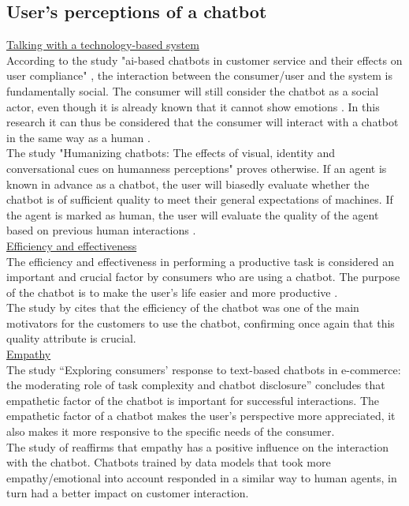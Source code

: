 \subsection{User’s perceptions of a chatbot}
\ul{Talking with a technology-based system}\\
According to the study "\acrshort{ai}-based chatbots in customer service and their effects on user compliance" \citep{Adam2021}, the interaction between the consumer/user and the system is fundamentally social. The consumer will still consider the chatbot as a social actor, even though it is already known that it cannot show emotions \citep{Adam2021}. In this research it can thus be considered that the consumer will interact with a chatbot in the same way as a human \citep*{Cheng2021,Ischen2020}.\\
\break
The study "Humanizing chatbots: The effects of visual, identity and conversational cues on humanness perceptions" proves otherwise. If an agent is known in advance as a chatbot, the user will biasedly evaluate whether the chatbot is of sufficient quality to meet their general expectations of machines. If the agent is marked as human, the user will evaluate the quality of the agent based on previous human interactions \citep*{Go2019,Shyam2008}.\\
\break
\ul{Efficiency and effectiveness}\\
The efficiency and effectiveness in performing a productive task is considered an important and crucial factor by consumers who are using a chatbot. The purpose of the chatbot is to make the user's life easier and more productive \citep{Brandtzaeg2018}.\\
\break
The study by \citeauthor{Skjuve2019} cites that the efficiency of the chatbot was one of the main motivators for the customers to use the chatbot, confirming once again that this quality attribute is crucial.\citep{Skjuve2019}\\
\break
\ul{Empathy}\\
The study “Exploring consumers' response to text-based chatbots in e-commerce: the moderating role of task complexity and chatbot disclosure” \citep{Cheng2021} concludes that empathetic factor of the chatbot is important for successful interactions. The empathetic factor of a chatbot makes the user's perspective more appreciated, it also makes it more responsive to the specific needs of the consumer.\\
\break
The study of \citeauthor{Agarwal2021} reaffirms that empathy has a positive influence on the interaction with the chatbot. Chatbots trained by data models that took more empathy/emotional into account responded in a similar way to human agents, in turn had a better impact on customer interaction. \citep{Agarwal2021}\\
